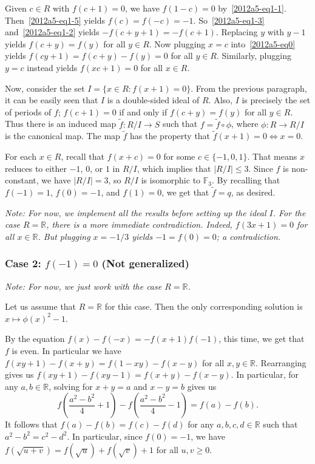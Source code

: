 \documentclass{article}
\newcommand{\F}{\mathbb{F}}
\newcommand{\R}{\mathbb{R}}
\begin{document}
\begin{itemize}
    Given $c \in R$ with $f(c + 1) = 0$, we have $f(1 - c) = 0$ by~\eqref{2012a5-eq1-1}.
    Then~\eqref{2012a5-eq1-5} yields $f(c) = f(-c) = -1$.
    So~\eqref{2012a5-eq1-3} and~\eqref{2012a5-eq1-2} yields $-f(c + y + 1) = -f(c + 1)$.
    Replacing $y$ with $y - 1$ yields $f(c + y) = f(y)$ for all $y \in R$.
    Now plugging $x = c$ into~\eqref{2012a5-eq0} yields $f(cy + 1) = f(c + y) - f(y) = 0$ for all $y \in R$.
    Similarly, plugging $y = c$ instead yields $f(xc + 1) = 0$ for all $x \in R$.

    Now, consider the set $I = \{x \in R : f(x + 1) = 0\}$.
    From the previous paragraph, it can be easily seen that $I$ is a double-sided ideal of $R$.
    Also, $I$ is precisely the set of periods of $f$; $f(c + 1) = 0$ if and only if $f(c + y) = f(y)$ for all $y \in R$.
    Thus there is an induced map $\tilde{f} : R/I \to S$ such that $f = \tilde{f} \circ \phi$, where $\phi : R \to R/I$ is the canonical map.
    The map $\tilde{f}$ has the property that $\tilde{f}(x + 1) = 0 \iff x = 0$.

    For each $x \in R$, recall that $f(x + c) = 0$ for some $c \in \{-1, 0, 1\}$.
    That means $x$ reduces to either $-1$, $0$, or $1$ in $R/I$, which implies that $|R/I| \leq 3$.
    Since $f$ is non-constant, we have $|R/I| = 3$, so $R/I$ is isomorphic to $\F_3$.
    By recalling that $f(-1) = 1$, $f(0) = -1$, and $f(1) = 0$, we get that $\tilde{f} = q$, as desired.

    \textit{Note:
        For now, we implement all the results before setting up the ideal $I$.
        For the case $R = \R$, there is a more immediate contradiction.
        Indeed, $f(3x + 1) = 0$ for all $x \in \R$.
        But plugging $x = -1/3$ yields $-1 = f(0) = 0$; a contradiction.}

\end{itemize}


\subsubsection*{Case 2: $f(-1) = 0$ (Not generalized)}

\textit{Note: For now, we just work with the case $R = \R$.}

Let us assume that $R = \R$ for this case.
Then the only corresponding solution is $x \mapsto \phi(x)^2 - 1$.

By the equation $f(x) - f(-x) = -f(x + 1) f(-1)$, this time, we get that $f$ is even.
In particular we have $f(xy + 1) - f(x + y) = f(1 - xy) - f(x - y)$ for all $x, y \in \R$.
Rearranging gives us $f(xy + 1) - f(xy - 1) = f(x + y) - f(x - y)$.
In particular, for any $a, b \in \R$, solving for $x + y = a$ and $x - y = b$ gives us
\[ f\left(\frac{a^2 - b^2}{4} + 1\right) - f\left(\frac{a^2 - b^2}{4} - 1\right) = f(a) - f(b). \]
It follows that $f(a) - f(b) = f(c) - f(d)$ for any $a, b, c, d \in \R$ such that $a^2 - b^2 = c^2 - d^2$.
In particular, since $f(0) = -1$, we have $f(\sqrt{u + v}) = f(\sqrt{u}) + f(\sqrt{v}) + 1$ for all $u, v \geq 0$.
\end{document}
